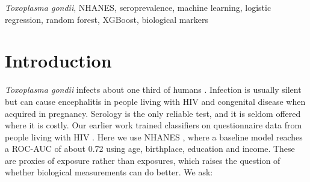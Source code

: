 \documentclass[conference]{IEEEtran}
\begin{document}
\begin{abstract}
Serological testing for \emph{Toxoplasma gondii} is rarely offered, so a model that estimates infection risk from survey answers could
support screening. Using the U.S.\ National Health and Nutrition Examination Survey (NHANES 2013--2014; 5,006 adults, 15.0\% seropositive),
we trained logistic regression, random forest, gradient boosting and XGBoost on demographic and lifestyle variables. The best baseline,
logistic regression, reached a cross-validated ROC-AUC of 0.722 (test 0.712). We then added 44 biological and exposure markers from 20
NHANES files: other infections, blood and environmental markers, water, diet, housing and work. The markers helped only a little: the
cross-validated ROC-AUC did not rise significantly (best 0.723), while the test ROC-AUC rose by 0.015--0.020 for logistic regression and
XGBoost. Seventeen markers remained associated with infection after adjustment for age, sex and birthplace. Pooling three NHANES cycles
(14,649 adults), modelling age flexibly, keeping the associated markers and averaging logistic regression with XGBoost gave the best
model: cross-validated ROC-AUC 0.740 ($p<0.001$) and test ROC-AUC 0.730 [0.688, 0.774]. All 5,310 NHANES variables, hyperparameter tuning
and deeper models did not go further. Prediction from NHANES is limited by the absence of direct exposure questions, not by the learners.
\end{abstract}

\begin{IEEEkeywords}
\emph{Toxoplasma gondii}, NHANES, seroprevalence, machine learning, logistic regression, random forest, XGBoost, biological markers
\end{IEEEkeywords}

\section{Introduction}
\emph{Toxoplasma gondii} infects about one third of humans \cite{montoya2004,pappas2009}. Infection is usually silent but can cause
encephalitis in people living with HIV \cite{luft1992} and congenital disease when acquired in pregnancy. Serology is the only reliable
test, and it is seldom offered where it is costly. Our earlier work trained classifiers on questionnaire data from people living with
HIV \cite{ichwan2025}. Here we use NHANES \cite{nhanes}, where a baseline model reaches a ROC-AUC of about 0.72 using age, birthplace,
education and income. These are proxies of exposure rather than exposures, which raises the question of whether biological
measurements can do better. We ask:
\end{document}
